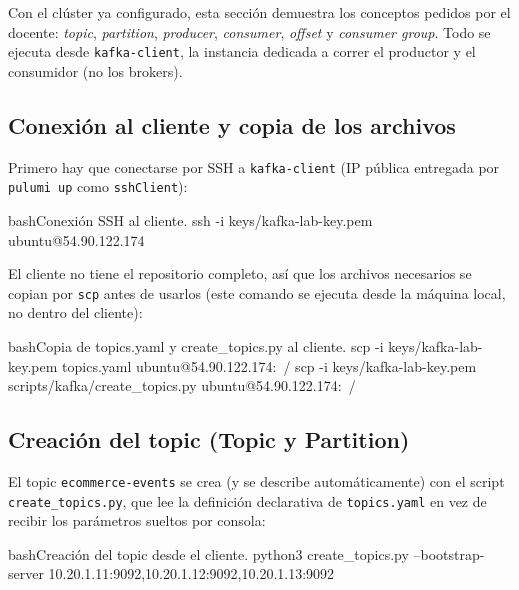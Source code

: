 	Con el clúster ya configurado, esta sección demuestra los conceptos pedidos por el docente: \textit{topic}, \textit{partition}, \textit{producer}, \textit{consumer}, \textit{offset} y \textit{consumer group}. Todo se ejecuta desde \texttt{kafka-client}, la instancia dedicada a correr el productor y el consumidor (no los brokers).

	\subsection{Conexión al cliente y copia de los archivos}

		Primero hay que conectarse por SSH a \texttt{kafka-client} (IP pública entregada por \texttt{pulumi up} como \texttt{sshClient}):

		\begin{sourcecode}[\label{codigo-ssh-client}]{bash}{Conexión SSH al cliente.}
ssh -i keys/kafka-lab-key.pem ubuntu@54.90.122.174
		\end{sourcecode}

		El cliente no tiene el repositorio completo, así que los archivos necesarios se copian por \texttt{scp} antes de usarlos (este comando se ejecuta desde la máquina local, no dentro del cliente):

		\begin{sourcecode}[\label{codigo-scp-topics}]{bash}{Copia de topics.yaml y create\_topics.py al cliente.}
scp -i keys/kafka-lab-key.pem topics.yaml ubuntu@54.90.122.174:~/
scp -i keys/kafka-lab-key.pem scripts/kafka/create_topics.py ubuntu@54.90.122.174:~/
		\end{sourcecode}

	\subsection{Creación del topic (Topic y Partition)}

		El topic \texttt{ecommerce-events} se crea (y se describe automáticamente) con el script \texttt{create\_topics.py}, que lee la definición declarativa de \texttt{topics.yaml} en vez de recibir los parámetros sueltos por consola:

		\begin{sourcecode}[\label{codigo-create-topics}]{bash}{Creación del topic desde el cliente.}
python3 create_topics.py --bootstrap-server 10.20.1.11:9092,10.20.1.12:9092,10.20.1.13:9092
		\end{sourcecode}


